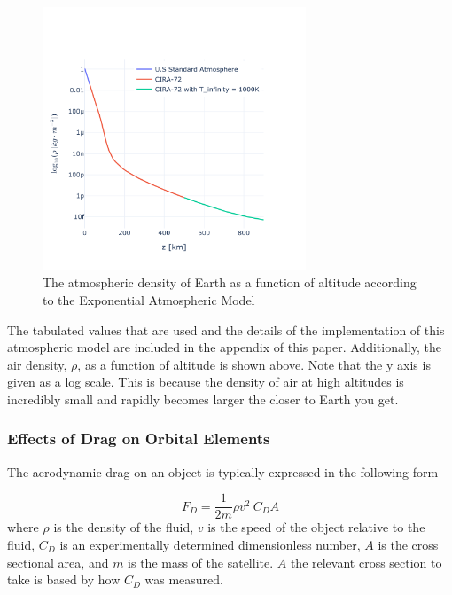 \documentclass{article}
\begin{document}
\begin{figure}[H]
	\centering     %
	\vspace*{-1.5in}
	\includegraphics[width=0.7\textwidth]{Atmospheric_Density_v_Altitude}
	\caption{The atmospheric density of Earth as a function of altitude according to the Exponential Atmospheric Model}
\end{figure}

The tabulated values that are used and the details of the implementation of this atmospheric model are included in the appendix of this paper. Additionally, the air density, $\rho$, as a function of altitude is shown above. Note that the y axis is given as a log scale. This is because the density of air at high altitudes is incredibly small and rapidly becomes larger the closer to Earth you get.

\subsubsection{Effects of Drag on Orbital Elements}

The aerodynamic drag on an object is typically expressed in the following form

\begin{equation}
	F_D = \frac{1}{2m} \rho v^2 \: C_D A
\end{equation}
where $\rho$ is the density of the fluid, $v$ is the speed of the object relative to the fluid, $C_D$ is an experimentally determined dimensionless number, $A$ is the cross sectional area, and $m$ is the mass of the satellite. $A$ the relevant cross section to take is based by how $C_D$ was measured. 
\end{document}
